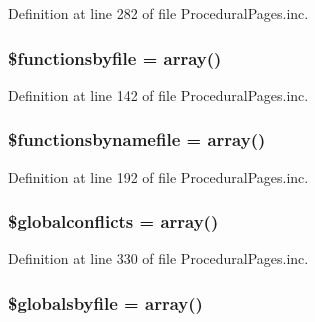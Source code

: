 \-Definition at line 282 of file \-Procedural\-Pages.\-inc.

\hypertarget{class_procedural_pages_ad289404b98cf1f85f75042ddebf2e5c3}{
\subsubsection[{\$functionsbyfile}]{\setlength{\rightskip}{0pt plus 5cm}\$functionsbyfile = array()}}\label{class_procedural_pages_ad289404b98cf1f85f75042ddebf2e5c3}


\-Definition at line 142 of file \-Procedural\-Pages.\-inc.

\hypertarget{class_procedural_pages_ad74f7a6d1bedafd5149fe4b10e16d3fe}{
\subsubsection[{\$functionsbynamefile}]{\setlength{\rightskip}{0pt plus 5cm}\$functionsbynamefile = array()}}\label{class_procedural_pages_ad74f7a6d1bedafd5149fe4b10e16d3fe}


\-Definition at line 192 of file \-Procedural\-Pages.\-inc.

\hypertarget{class_procedural_pages_a95e2576c016d42d6546a65994032ed88}{
\subsubsection[{\$globalconflicts}]{\setlength{\rightskip}{0pt plus 5cm}\$globalconflicts = array()}}\label{class_procedural_pages_a95e2576c016d42d6546a65994032ed88}


\-Definition at line 330 of file \-Procedural\-Pages.\-inc.

\hypertarget{class_procedural_pages_a66416e77330fb9944e988e026fb870ce}{
\subsubsection[{\$globalsbyfile}]{\setlength{\rightskip}{0pt plus 5cm}\$globalsbyfile = array()}}\label{class_procedural_pages_a66416e77330fb9944e988e026fb870ce}


